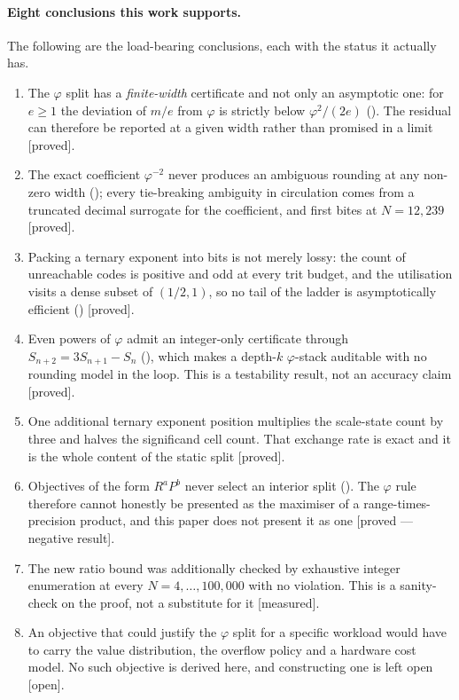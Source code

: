 \paragraph{Eight conclusions this work supports.} The following are the load-bearing
conclusions, each with the status it actually has.

\begin{enumerate}
\item The $\varphi$ split has a \emph{finite-width} certificate and not only an
asymptotic one: for $e\geq1$ the deviation of $m/e$ from $\varphi$ is strictly
below $\varphi^{2}/(2e)$ (). The residual can
therefore be reported at a given width rather than promised in a limit
[proved].

\item The exact coefficient $\varphi^{-2}$ never produces an ambiguous rounding at
any non-zero width (); every tie-breaking
ambiguity in circulation comes from a truncated decimal surrogate for the
coefficient, and first bites at $N=12{,}239$ [proved].

\item Packing a ternary exponent into bits is not merely lossy: the count of
unreachable codes is positive and odd at every trit budget, and the utilisation
visits a dense subset of $(1/2,1)$, so no tail of the ladder is asymptotically
efficient () [proved].

\item Even powers of $\varphi$ admit an integer-only certificate through
$S_{n+2}=3S_{n+1}-S_n$ (), which makes a depth-$k$
$\varphi$-stack auditable with no rounding model in the loop. This is a testability
result, not an accuracy claim [proved].

\item One additional ternary exponent position multiplies the scale-state count by
three and halves the significand cell count. That exchange rate is exact and it is
the whole content of the static split [proved].

\item Objectives of the form $R^{a}P^{b}$ never select an interior split
(). The $\varphi$ rule therefore cannot
honestly be presented as the maximiser of a range-times-precision product, and
this paper does not present it as one [proved --- negative result].

\item The new ratio bound was additionally checked by exhaustive integer
enumeration at every $N=4,\dots,100{,}000$ with no violation. This is a
sanity-check on the proof, not a substitute for it [measured].

\item An objective that could justify the $\varphi$ split for a specific workload
would have to carry the value distribution, the overflow policy and a hardware
cost model. No such objective is derived here, and constructing one is left open
[open].
\end{enumerate}

